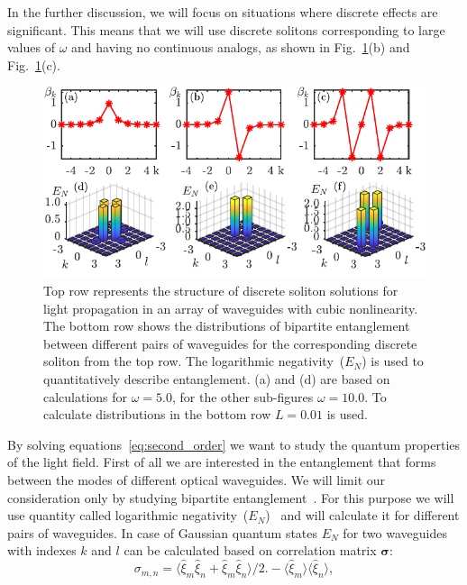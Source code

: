 \documentclass{osa-article}
\begin{document}
In the further discussion, we will focus on situations where discrete effects are significant. 
This means that we will use discrete solitons corresponding to large values of $\omega$ and having no continuous analogs, as shown in Fig.~\ref{fig:structure}(b) and Fig.~\ref{fig:structure}(c).
\par
\begin{figure}[h!]
	\centering\includegraphics{fig2}
	\caption{Top row represents the structure of discrete soliton solutions for light propagation in an array of waveguides with cubic nonlinearity. The bottom row shows the distributions of bipartite entanglement between different pairs of waveguides for the corresponding discrete soliton from the top row. The logarithmic negativity~($E_N$) is used to quantitatively describe entanglement. (a) and (d) are based on calculations for $\omega = 5.0$, for the other sub-figures $\omega = 10.0$. To calculate distributions in the bottom row $L=0.01$ is used.}
	\label{fig:structure}
\end{figure}
By solving equations~\eqref{eq:second_order} we want to study the quantum properties of the light field.
First of all we are interested in the entanglement that forms between the modes of different optical waveguides.
We will limit our consideration only by studying bipartite entanglement~\cite{gebremariam_tesfahannes_generation_2020, tura_detecting_2014}.
For this purpose we will use quantity called logarithmic negativity~($E_N$)~\cite{vidal_computable_2002} and will calculate it for different pairs of waveguides. 
In case of Gaussian quantum states $E_N$ for two waveguides with indexes $k$ and $l$ can be calculated based on correlation matrix $\bm{\sigma}$:
\begin{equation}\label{eq:cov_matr}
	\sigma_{m,n}=\langle\hat{\xi}_{m}\hat{\xi}_{n}+\hat{\xi}_{m}\hat{\xi}_{n}\rangle\bigl/2\bigr.-\langle\hat{\xi}_{m}\rangle\langle\hat{\xi}_{n}\rangle,    
\end{equation}
\end{document}
